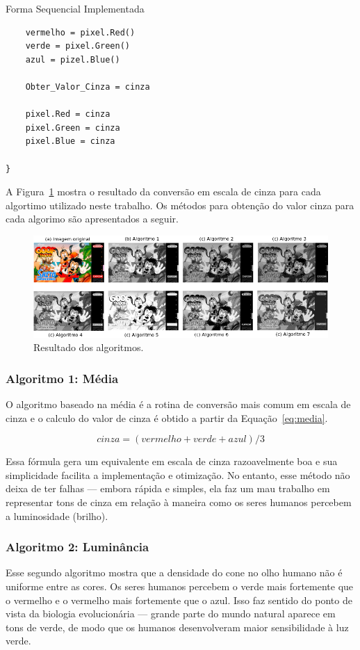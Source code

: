 \begin{subsection}{Forma Sequencial Implementada}
\begin{lstlisting}
	vermelho = pixel.Red()
	verde = pixel.Green()
	azul = pizel.Blue()

	Obter_Valor_Cinza = cinza

	pixel.Red = cinza
	pixel.Green = cinza
	pixel.Blue = cinza

}
\end{lstlisting}


A Figura~\ref{fig:example} mostra o resultado da conversão em escala de cinza
para cada algortimo utilizado neste trabalho.  Os métodos para obtenção do valor
cinza para cada algorimo são apresentados a seguir.

\begin{figure}[!h]
	\centering
	\includegraphics[width=0.95\linewidth]{figs/gray.png}
	\caption{Resultado dos algoritmos.}
	\label{fig:example}
\end{figure}

\subsubsection{Algoritmo 1: Média}
O algoritmo baseado na média é a rotina de conversão mais comum em escala de
cinza e o calculo do valor de cinza é obtido a partir da Equação~\ref{eq:media}.

\begin{equation}
\label{eq:media}
cinza = (vermelho + verde + azul)/3
\end{equation}

Essa fórmula gera um equivalente em escala de cinza razoavelmente boa e sua
simplicidade facilita a implementação e otimização. No entanto, esse método não
deixa de ter falhas --- embora rápida e simples, ela faz um mau trabalho em
representar tons de cinza em relação à maneira como os seres humanos percebem a
luminosidade (brilho).


\subsubsection{Algoritmo 2: Luminância}
Esse segundo algoritmo mostra que a densidade do cone no olho humano não é
uniforme entre as cores. Os seres humanos percebem o verde mais fortemente que o
vermelho e o vermelho mais fortemente que o azul. Isso faz sentido do ponto de
vista da biologia evolucionária --- grande parte do mundo natural aparece em
tons de verde, de modo que os humanos desenvolveram maior sensibilidade à luz
verde.


\end{subsection}
